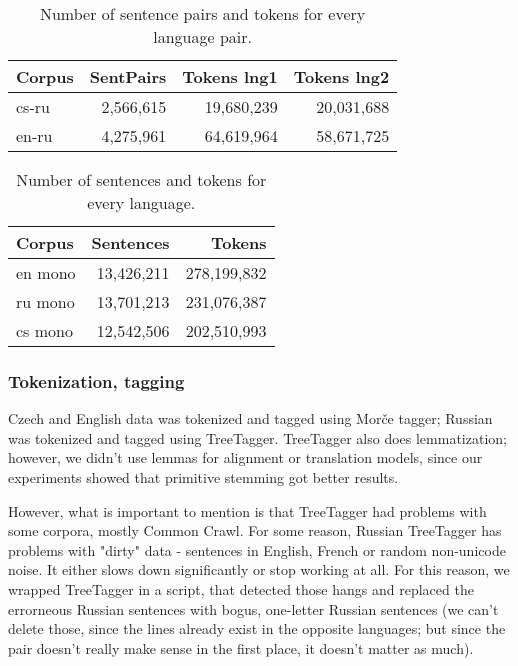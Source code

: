 \documentclass[11pt,letterpaper]{article}
\begin{document}
\begin{table}[htbl]
\begin{center}
\begin{tabular}{l | r r r}
Corpus & SentPairs & Tokens lng1 & Tokens lng2\\
\hline
cs-ru & 2,566,615 & 19,680,239 & 20,031,688 \\
en-ru & 4,275,961 & 64,619,964 & 58,671,725 \\
\end{tabular}
\end{center}
\caption{Number of sentence pairs and tokens for every language pair.}
\label{tab:russdata}
\end{table}
\begin{table}[htbl]
\begin{center}
\begin{tabular}{l | r r }
Corpus & Sentences & Tokens \\
\hline
en mono& 13,426,211  & 278,199,832   \\
ru mono& 13,701,213 & 231,076,387   \\
cs mono& 12,542,506 & 202,510,993  
\end{tabular}
\end{center}
\caption{Number of sentences and tokens for every language.}
\label{tab:russdatam}
\end{table}

\subsubsection{Tokenization, tagging}

Czech and English data was tokenized and tagged using Morče tagger; Russian was tokenized and tagged using TreeTagger. TreeTagger also does lemmatization; however, we didn't use lemmas for alignment or translation models, since our experiments showed that primitive stemming got better results.

However, what is important to mention is that TreeTagger had problems with some corpora, mostly Common Crawl. For some reason, Russian TreeTagger has problems with "dirty" data - sentences in English, French or random non-unicode noise. It either slows down significantly or stop working at all. For this reason, we wrapped TreeTagger in a script, that detected those hangs and replaced the errorneous Russian sentences with bogus, one-letter Russian sentences (we can't delete those, since the lines already exist in the opposite languages; but since the pair doesn't really make sense in the first place, it doesn't matter as much).
\end{document}

